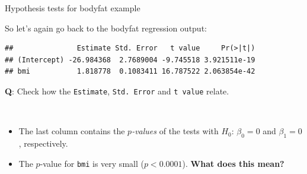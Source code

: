 \documentclass[
  10pt,
  ignorenonframetext,
]{beamer}
\newenvironment{Shaded}{\begin{snugshade}}{\end{snugshade}}
\newcommand{\FunctionTok}[1]{\textcolor[rgb]{0.13,0.29,0.53}{\textbf{#1}}}
\newcommand{\NormalTok}[1]{#1}
\newcommand{\SpecialCharTok}[1]{\textcolor[rgb]{0.81,0.36,0.00}{\textbf{#1}}}
\begin{document}
\begin{frame}[fragile]
\begin{block}{Hypothesis tests for bodyfat example}
\protect\hypertarget{hypothesis-tests-for-bodyfat-example}{}
\(~\)

So let's again go back to the bodyfat regression output:

\vspace{2mm}

\scriptsize

\begin{Shaded}
\end{Shaded}

\begin{verbatim}
##               Estimate Std. Error   t value     Pr(>|t|)
## (Intercept) -26.984368  2.7689004 -9.745518 3.921511e-19
## bmi           1.818778  0.1083411 16.787522 2.063854e-42
\end{verbatim}

\vspace{2mm}

\normalsize

\textbf{Q}: Check how the \texttt{Estimate}, \texttt{Std.\ Error} and
\texttt{t\ value} relate.

\(~\)

\begin{itemize}
\item
  The last column contains the \emph{\(p\)-values} of the tests with
  \(H_0\): \(\beta_0=0\) and \(\beta_1=0\), respectively.
\item
  The \(p\)-value for \texttt{bmi} is very small (\(p<0.0001\)).
  \textbf{What does this mean?}
\end{itemize}
\end{block}
\end{frame}
\end{document}
